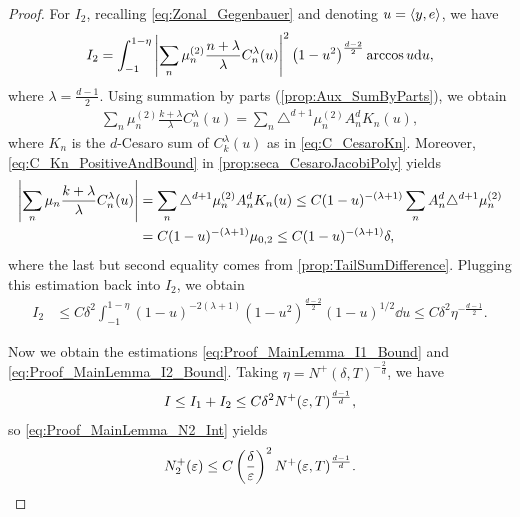 \begin{proof}
  For $I_2$, recalling \cref{eq:Zonal_Gegenbauer} and denoting $u = \left\langle{y,{e}}\right\rangle$, we have
  \begin{align*}
    I_2    = \int_{-1}^{1-\eta} \abs{\sum_{n} \mu_n^{(2)} \frac{n+\lambda}{\lambda}  C_n^{\lambda}(u)}^2 \left( 1-u^2 \right)^{\frac{d-2}{2}} \arccos u \dd u,
  \end{align*}
  where $\lambda = \frac{d-1}{2}$.
  Using summation by parts (\cref{prop:Aux_SumByParts}), we obtain
  \begin{align*}
    \sum_{n} \mu_n^{(2)} \frac{k+\lambda}{\lambda}  C_n^{\lambda}(u) = \sum_n \triangle^{d+1} \mu_n^{(2)}  A_n^d K_n(u) ,
  \end{align*}
  where $K_n$  is the $d$-Cesaro sum of $C^{\lambda}_k(u)$ as in \cref{eq:C_CesaroKn}.
  Moreover, \cref{eq:C_Kn_PositiveAndBound} in \cref{prop:seca_CesaroJacobiPoly} yields
  \begin{align*}
    \abs{\sum_{n} \mu_n \frac{k+\lambda}{\lambda}  C_n^{\lambda}(u)}
    &= \sum_n \triangle^{d+1} \mu_n^{(2)} A_n^d K_n(u)
    \leq C (1-u)^{-(\lambda+1)} \sum_n A_n^d \triangle^{d+1}\mu_n^{(2)} \\
    & = C (1-u)^{-(\lambda+1)} \mu_{0,2} \leq C (1-u)^{-(\lambda+1)} \delta ,
  \end{align*}
  where the last but second equality comes from  \cref{prop:TailSumDifference}.
  Plugging this estimation back into $I_2$, we obtain
  \begin{align}
    \label{eq:Proof_MainLemma_I2_Bound}
    I_2 & \leq C  \delta^2  \int_{-1}^{1-\eta} (1-u)^{-2(\lambda+1)} \left( 1-u^2 \right)^{\frac{d-2}{2}} (1-u)^{1/2} \dd u
    \leq  C \delta^2  \eta^{-\frac{d-1}{2}}.
  \end{align}

  Now we obtain the estimations \cref{eq:Proof_MainLemma_I1_Bound} and \cref{eq:Proof_MainLemma_I2_Bound}.
  Taking $\eta = N^+(\delta,T)^{-\frac{2}{d}}$, we have
  \begin{align*}
    I \leq I_1 + I_2 \leq C\delta^2 N^+(\varepsilon,T)^{\frac{d-1}{d}},
  \end{align*}
  so \cref{eq:Proof_MainLemma_N2_Int} yields
  \begin{align}
    \label{eq:Proof_MainLemma_N2_Bound}
    N_2^+(\varepsilon) \leq C \left( \frac{\delta}{\varepsilon} \right)^2 N^+(\varepsilon,T)^{\frac{d-1}{d}}.
  \end{align}


\end{proof}
